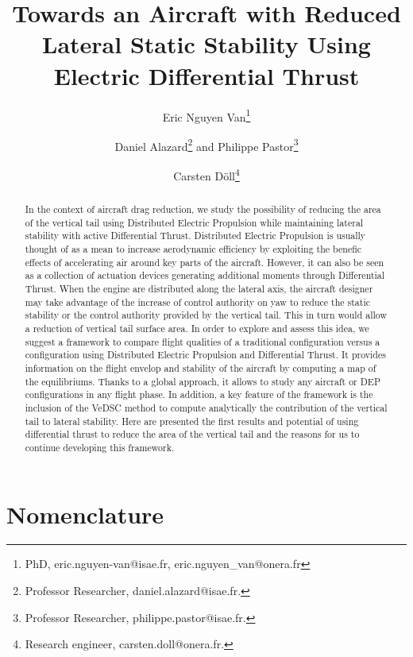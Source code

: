 \documentclass[conf]{new-aiaa} %
\title{Towards an Aircraft with Reduced Lateral Static Stability Using Electric Differential Thrust}
\author{Eric Nguyen Van\footnote{PhD, eric.nguyen-van@isae.fr, eric.nguyen\_van@onera.fr}}
\affil{ISAE DCAS, Toulouse, France}
\affil{ONERA DTIS, Toulouse France}
\author{Daniel Alazard\footnote{Professor Researcher, daniel.alazard@isae.fr.} and Philippe Pastor\footnote{Professor Researcher, philippe.pastor@isae.fr.}}
\affil{ISAE DCAS, Toulouse, France}
\author{Carsten D\"oll\footnote{Research engineer, carsten.doll@onera.fr.}}
\affil{ONERA DTIS, Toulouse, France}
\begin{document}
\maketitle

\begin{abstract}
In the context of aircraft drag reduction, we study the possibility of reducing the area of the vertical tail using Distributed Electric Propulsion while maintaining lateral stability with active Differential Thrust. Distributed Electric Propulsion is usually thought of as a mean to increase aerodynamic efficiency by exploiting the benefic effects of accelerating air around key parts of the aircraft. However, it can also be seen as a collection of actuation devices generating additional moments through Differential Thrust. When the engine are distributed along the lateral axis, the aircraft designer may take advantage of the increase of control authority on yaw to reduce the static stability or the control authority provided by the vertical tail. This in turn would allow a reduction of vertical tail surface area. In order to explore and assess this idea, we suggest a framework to compare flight qualities of a traditional configuration versus a configuration using Distributed Electric Propulsion and Differential Thrust. It provides information on the flight envelop and stability of the aircraft by computing a map of the equilibriums. Thanks to a global approach, it allows to study any aircraft or DEP configurations in any flight phase. In addition, a key feature of the framework is the inclusion of the VeDSC method to compute analytically the contribution of the vertical tail to lateral stability. Here are presented the first results and potential of using differential thrust to reduce the area of the vertical tail and the reasons for us to continue developing this framework.
\end{abstract}

\clearpage

\section*{Nomenclature}

\end{document}
